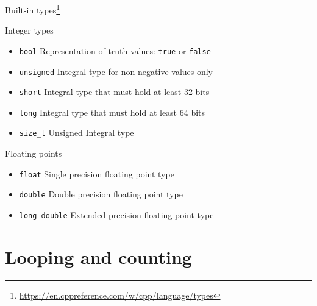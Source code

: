\documentclass[\classoption]{beamer}
\begin{document}
\begin{frame}{Built-in types\footnote{\tiny\url{https://en.cppreference.com/w/cpp/language/types}}}
\begin{block}{Integer types}
\begin{itemize}
\item \lstinline|bool| Representation of truth values: \lstinline|true| or \lstinline|false| 
\item \lstinline|unsigned| Integral type for non-negative values only 
\item \lstinline|short| Integral type that must hold at least 32 bits
\item \lstinline|long| Integral type that must hold at least 64 bits
\item \lstinline|size_t| Unsigned Integral type
\end{itemize}
\end{block}

\begin{block}{Floating points}
\begin{itemize}
\item \lstinline|float| Single precision floating point type
\item \lstinline|double| Double precision floating point type
\item \lstinline|long double| Extended precision floating point type
\end{itemize}
\end{block}

\end{frame}

\section{Looping and counting}
\end{document}
